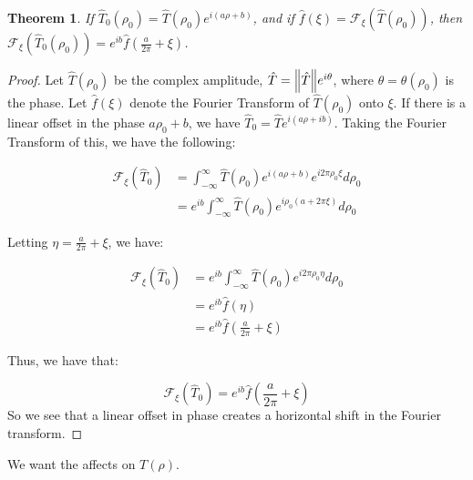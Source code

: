 \documentclass{article}
\theoremstyle{mystyle}
\newtheorem{theorem}{Theorem}[section]
\begin{document}
\begin{theorem}
If $\hat{T}_0(\rho_0) = \hat{T}(\rho_0)e^{i(a\rho+b)}$, and if $\hat{f}(\xi) = \mathcal{F}_{\xi}(\hat{T}(\rho_0))$, then $\mathcal{F}_{\xi}(\hat{T}_{0}(\rho_0)) = e^{ib}\hat{f}(\frac{a}{2\pi}+\xi)$.
\end{theorem}
\begin{proof}
\noindent Let $\hat{T}(\rho_0)$ be the complex amplitude, $\hat{T} = \norm{\hat{T}}e^{i\theta}$, where $\theta = \theta(\rho_0)$ is the phase. Let $\hat{f}(\xi)$ denote the Fourier Transform of $\hat{T}(\rho_0)$ onto $\xi$. If there is a linear offset in the phase $a\rho_0+b$, we have $\hat{T}_{0} = \hat{T}e^{i(a\rho+ib)}$. Taking the Fourier Transform of this, we have the following:

\begin{align}
\nonumber \mathcal{F}_{\xi} (\hat{T}_{0})&= \int_{-\infty}^{\infty}\hat{T}(\rho_0)e^{i(a\rho+b)}e^{i2\pi \rho_0 \xi}d\rho_0\\
&=e^{ib} \int_{-\infty}^{\infty} \hat{T}(\rho_0)e^{i\rho_0(a+2\pi \xi)}d\rho_0
\end{align}

Letting $\eta = \frac{a}{2\pi}+\xi$, we have:

\begin{align}
\nonumber \mathcal{F}_{\xi} (\hat{T}_{0}) &= e^{ib}\int_{-\infty}^{\infty}\hat{T}(\rho_0)e^{i2\pi\rho_{0}\eta}d\rho_0 \\
\nonumber &= e^{ib}\hat{f}(\eta)\\
		 &= e^{ib}\hat{f}(\frac{a}{2\pi}+\xi)
\end{align}

Thus, we have that:

\begin{equation}
\mathcal{F}_{\xi} (\hat{T}_{0}) = e^{ib}\hat{f}(\frac{a}{2\pi}+\xi)
\end{equation}
So we see that a linear offset in phase creates a horizontal shift in the Fourier transform.
\end{proof}

We want the affects on $T(\rho)$.
\end{document}
